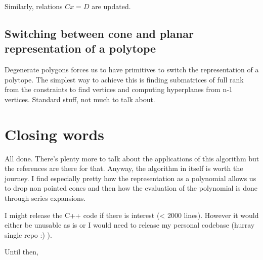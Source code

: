 \documentclass[14pt]{article}
\begin{document}
Similarly, relations $Cx=D$ are updated.



\subsection*{Switching between cone and planar representation of a polytope}

Degenerate polygons forces us to have primitives to switch the representation of a polytope. The simplest way to achieve this is finding submatrices of full rank from the constraints to find vertices and computing hyperplanes from n-1 vertices. Standard stuff, not much to talk about.


\section*{Closing words}

All done. There's plenty more to talk about the applications of this algorithm but the references are there for that.
Anyway, the algorithm in itself is worth the journey.  I find especially pretty how the representation as a polynomial allows us to drop non pointed cones and then how the evaluation of the polynomial is done through series expansions.

I might release the C++ code if there is interest (< 2000 lines). However it would either be unusable as is or I would need to release my personal codebase (hurray single repo :) ).

Until then,

{}

\end{document}
